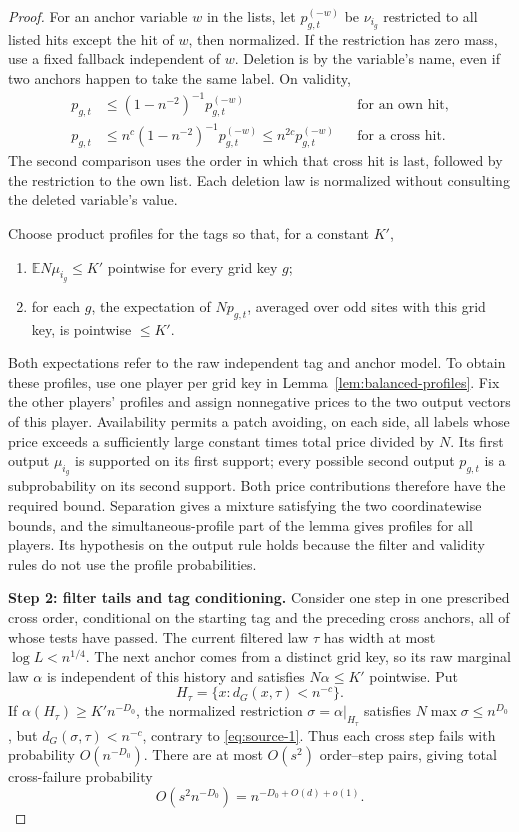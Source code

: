 \begin{proof}
For an anchor variable \(w\) in the lists, let \(p_{g,t}^{(-w)}\) be
\(\nu_{i_g}\) restricted to all listed hits except the hit of \(w\),
then normalized. If the restriction has zero mass, use a fixed fallback
independent of \(w\). Deletion is by the variable's name, even if two
anchors happen to take the same label. On validity,
\[
 \begin{aligned}
 p_{g,t}&\le(1-n^{-2})^{-1}p_{g,t}^{(-w)}
       &&\text{for an own hit},\\
 p_{g,t}&\le n^c(1-n^{-2})^{-1}p_{g,t}^{(-w)}
       \le n^{2c}p_{g,t}^{(-w)}
       &&\text{for a cross hit}.
 \end{aligned}
\]
The second comparison uses the order in which that cross hit is last,
followed by the restriction to the own list. Each deletion law is
normalized without consulting the deleted variable's value.

Choose product profiles for the tags so that, for a constant \(K'\),
\begin{enumerate}[label=\textup{(\roman*)}]
\item \(\mathbb E N\mu_{i_g}\le K'\) pointwise for every grid key \(g\);
\item for each \(g\), the expectation of \(Np_{g,t}\), averaged over
odd sites with this grid key, is pointwise \(\le K'\).
\end{enumerate}
Both expectations refer to the raw independent tag and anchor model.
To obtain these profiles, use one player per grid key in
Lemma~\ref{lem:balanced-profiles}. Fix the other players' profiles and
assign nonnegative prices to the two output vectors of this player.
Availability permits a patch avoiding, on each side, all labels whose
price exceeds a sufficiently large constant times total price divided
by \(N\). Its first output \(\mu_{i_g}\) is supported on its first
support; every possible second output \(p_{g,t}\) is a subprobability on
its second support. Both price contributions therefore have the required
bound. Separation gives a mixture satisfying the two coordinatewise
bounds, and the simultaneous-profile part of the lemma gives profiles
for all players. Its hypothesis on the output rule holds because the
filter and validity rules do not use the profile probabilities.

\noindent\textbf{Step 2: filter tails and tag conditioning.}\quad
Consider one step in one prescribed cross order, conditional on the
starting tag and the preceding cross anchors, all of whose tests have
passed. The current filtered law \(\tau\) has width at most
\(\log L<n^{1/4}\). The next anchor comes from a distinct grid key, so
its raw marginal law \(\alpha\) is independent of this history and
satisfies \(N\alpha\le K'\) pointwise. Put
\[
 H_\tau=\{x:d_G(x,\tau)<n^{-c}\}.
\]
If \(\alpha(H_\tau)\ge K'n^{-D_0}\), the normalized restriction
\(\sigma=\alpha|_{H_\tau}\) satisfies
\(N\max\sigma\le n^{D_0}\), but
\(d_G(\sigma,\tau)<n^{-c}\), contrary to \eqref{eq:source-1}. Thus each
cross step fails with probability \(O(n^{-D_0})\). There are at most
\(O(s^2)\) order--step pairs, giving total cross-failure probability
\[
 O(s^2n^{-D_0})=n^{-D_0+O(d)+o(1)}.
\]


\end{proof}
